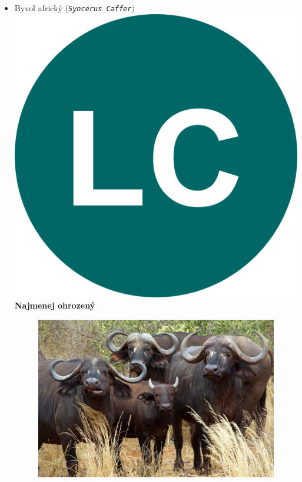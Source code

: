 \documentclass{article}
\begin{document}
\begin{flushright}
\begin{itemize}
\item Byvol africký $($\texttt{\textit{Syncerus Caffer}}$)$ \includegraphics[scale=0.015]{LC.png}{\color{ForestGreen} \textbf{Najmenej ohrozený}}

\begin{figure}[h]

\includegraphics[scale=0.2]{byvoly-masai.jpg}
\end{figure}


\end{itemize}
\end{flushright}
\end{document}
